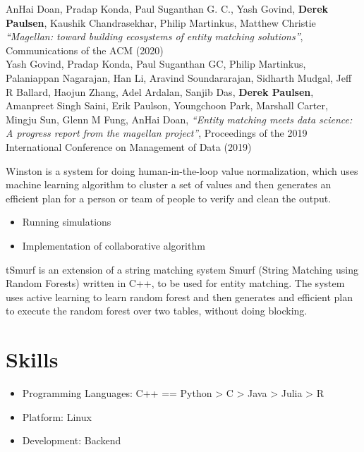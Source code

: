 \documentclass{resume}
\begin{document}
AnHai Doan, Pradap Konda, Paul Suganthan G. C., Yash Govind, \textbf{Derek Paulsen}, Kaushik Chandrasekhar, Philip Martinkus, Matthew Christie
\textit{``Magellan: toward building ecosystems of entity matching solutions''},
Communications of the ACM (2020)\\

Yash Govind, Pradap Konda, Paul Suganthan GC, Philip Martinkus, Palaniappan Nagarajan, Han Li, Aravind Soundararajan, Sidharth Mudgal, Jeff R Ballard, Haojun Zhang, Adel Ardalan, Sanjib Das, \textbf{Derek Paulsen}, Amanpreet Singh Saini, Erik Paulson, Youngchoon Park, Marshall Carter, Mingju Sun, Glenn M Fung, AnHai Doan,
\textit{``Entity matching meets data science: A progress report from the magellan project''},
Proceedings of the 2019 International Conference on Management of Data (2019)\\


Winston is a system for doing human-in-the-loop value normalization, which uses machine learning 
algorithm to cluster a set of values and then generates an efficient plan for a person or team 
of people to verify and clean the output.
\begin{itemize}
    \item Running simulations
    \item Implementation of collaborative algorithm 
\end{itemize}

tSmurf is an extension of a string matching system Smurf (String Matching using Random Forests) written in C++, 
to be used for entity matching. The system uses active learning to learn random forest and then 
generates and efficient plan to execute the random forest over two tables, without doing blocking.




\section{Skills}
\begin{itemize}[parsep=0.5ex]
  \item Programming Languages: C++ == Python > C > Java > Julia > R
  \item Platform: Linux
  \item Development: Backend
\end{itemize}
\end{document}
